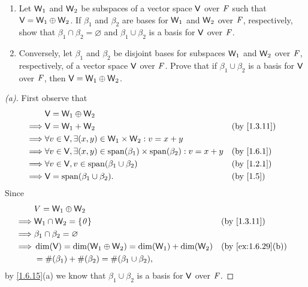 \setcounter{ex}{32}
\begin{ex}\label{ex:1.6.33}
  \quad
  \begin{enumerate}
    \item Let \(\mathsf{W}_1\) and \(\mathsf{W}_2\) be subspaces of a vector space \(\mathsf{V}\) over \(\mathit{F}\) such that \(\mathsf{V} = \mathsf{W}_1 \oplus \mathsf{W}_2\).
          If \(\beta_1\) and \(\beta_2\) are bases for \(\mathsf{W}_1\) and \(\mathsf{W}_2\) over \(\mathit{F}\), respectively, show that \(\beta_1 \cap \beta_2 = \varnothing\) and \(\beta_1 \cup \beta_2\) is a basis for \(\mathsf{V}\) over \(\mathit{F}\).
    \item Conversely, let \(\beta_1\) and \(\beta_2\) be disjoint bases for subspaces \(\mathsf{W}_1\) and \(\mathsf{W}_2\) over \(\mathit{F}\), respectively, of a vector space \(\mathsf{V}\) over \(\mathit{F}\).
          Prove that if \(\beta_1 \cup \beta_2\) is a basis for \(\mathsf{V}\) over \(\mathit{F}\), then \(\mathsf{V} = \mathsf{W}_1 \oplus \mathsf{W}_2\).
  \end{enumerate}
\end{ex}

\begin{proof}[(a)]
  First observe that
  \begin{align*}
             & \V = \W_1 \oplus \W_2                                                                                              \\
    \implies & \V = \W_1 + \W_2                                                                    &  & \text{(by \cref{1.3.11})} \\
    \implies & \forall v \in \V, \exists (x, y) \in \W_1 \times \W_2 : v = x + y                                                  \\
    \implies & \forall v \in \V, \exists (x, y) \in \spn{\beta_1} \times \spn{\beta_2} : v = x + y &  & \text{(by \cref{1.6.1})}  \\
    \implies & \forall v \in \V, v \in \spn{\beta_1 \cup \beta_2}                                  &  & \text{(by \cref{1.2.1})}  \\
    \implies & \V = \spn{\beta_1 \cup \beta_2}.                                                    &  & \text{(by \cref{1.5})}
  \end{align*}
  Since
  \begin{align*}
             & V = \W_1 \oplus \W_2                                                                             \\
    \implies & \W_1 \cap \W_2 = \set{\zv}                                  &  & \text{(by \cref{1.3.11})}       \\
    \implies & \beta_1 \cap \beta_2 = \varnothing                                                               \\
    \implies & \dim(\V) = \dim(\W_1 \oplus \W_2) = \dim(\W_1) + \dim(\W_2) &  & \text{(by \cref{ex:1.6.29}(b))} \\
             & = \#(\beta_1) + \#(\beta_2) = \#(\beta_1 \cup \beta_2),
  \end{align*}
  by \cref{1.6.15}(a) we know that \(\beta_1 \cup \beta_2\) is a basis for \(\mathsf{V}\) over \(\mathit{F}\).
\end{proof}

